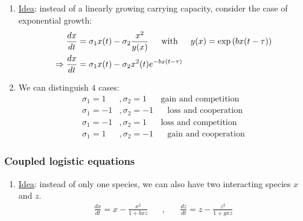 \begin{enumerate}[]
    \item \underline{Idea}: instead of a linearly growing carrying capacity,
        consider the case of exponential growth:
        \begin{align*}
            \frac{d x}{d t} &= \sigma_1 x(t) - \sigma_2 \frac{x^2}{y(x)}
            \hspace{15pt} \text{with} \hspace{15pt}
            y(x) = \exp \left( b x(t - \tau) \right)
            \\
            \Rightarrow
            \frac{d x}{d t} &= \sigma_1 x(t) - \sigma_2 x^2(t) e^{-b x(t - \tau)}
        \end{align*}
    \item We can distinguish $4$ cases:
        \begin{align*}
            \sigma_1 = 1 &, \sigma_2 = 1
            \hspace{20pt} \text{gain and competition}
            \\
            \sigma_1 = -1 &, \sigma_2 = -1
            \hspace{20pt} \text{loss and cooperation}
            \\
            \sigma_1 = -1 &, \sigma_2 = 1
            \hspace{20pt} \text{loss and competition}
            \\
            \sigma_1 = 1 &, \sigma_2 = -1
            \hspace{20pt} \text{gain and cooperation}
        \end{align*}
\end{enumerate}


\subsubsection{Coupled logistic equations}

\begin{enumerate}[]
    \item \underline{Idea}: instead of only one species, we can also have
        two interacting species $x$ and $z$.
        \begin{align*}
            \frac{d x}{d t} = x - \frac{x^2}{1 + b x z}
            \hspace{20pt} , \hspace{20pt}
            \frac{d z}{d t} = z - \frac{z^2}{1 + g x z}
        \end{align*}
\end{enumerate}

